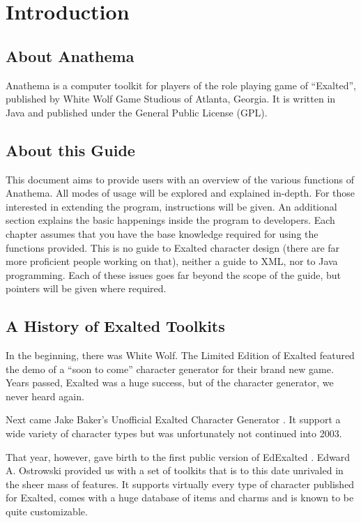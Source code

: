 \chapter{Introduction}
\section{About Anathema}
Anathema is a computer toolkit for players of the role playing game of ``Exalted'', published by White Wolf Game Studious of Atlanta, Georgia. It is written in Java and published under the General Public License (GPL).

\section{About this Guide}
This document aims to provide users with an overview of the various functions of Anathema. All modes of usage will be explored and explained in-depth. For those interested in extending the program, instructions will be given. An additional section explains the basic happenings inside the program to developers.
Each chapter assumes that you have the base knowledge required for using the functions provided. This is no guide to Exalted character design (there are far more proficient people working on that), neither a guide to XML, nor to Java programming. Each of these issues goes far beyond the scope of the guide, but pointers will be given where required.

\section{A History of Exalted Toolkits}
In the beginning, there was White Wolf. The Limited Edition of Exalted featured the demo of a ``soon to come'' character generator for their brand new game. Years passed, Exalted was a huge success, but of the character generator, we never heard again.

Next came Jake Baker's Unofficial Exalted Character Generator \cite{UECG}. It support a wide variety of character types but was unfortunately not continued into 2003.

That year, however, gave birth to the first public version of EdExalted \cite{EdExalted}. Edward A. Ostrowski provided us with a set of toolkits that is to this date unrivaled in the sheer mass of features. It supports virtually every type of character published for Exalted, comes with a huge database of items and charms and is known to be quite customizable.

